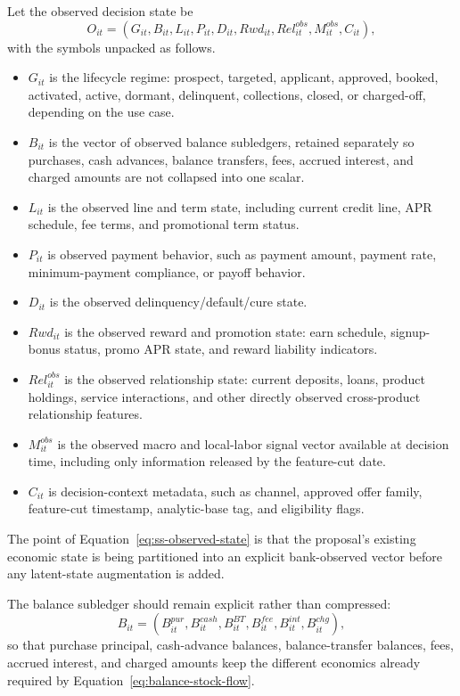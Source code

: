 \documentclass[11pt]{article}
\newcommand{\1}{\mathbf{1}}
\begin{document}
Let the observed decision state be
\begin{equation}
  O_{it}
  =
  (G_{it},B_{it},L_{it},P_{it},D_{it},Rwd_{it},Rel^{obs}_{it},M^{obs}_{it},C_{it}),
  \label{eq:ss-observed-state}
\end{equation}
with the symbols unpacked as follows.
\begin{itemize}[leftmargin=*]
  \item $G_{it}$ is the lifecycle regime: prospect, targeted, applicant,
        approved, booked, activated, active, dormant, delinquent, collections,
        closed, or charged-off, depending on the use case.
  \item $B_{it}$ is the vector of observed balance subledgers, retained
        separately so purchases, cash advances, balance transfers, fees,
        accrued interest, and charged amounts are not collapsed into one scalar.
  \item $L_{it}$ is the observed line and term state, including current credit
        line, APR schedule, fee terms, and promotional term status.
  \item $P_{it}$ is observed payment behavior, such as payment amount,
        payment rate, minimum-payment compliance, or payoff behavior.
  \item $D_{it}$ is the observed delinquency/default/cure state.
  \item $Rwd_{it}$ is the observed reward and promotion state: earn schedule,
        signup-bonus status, promo APR state, and reward liability indicators.
  \item $Rel^{obs}_{it}$ is the observed relationship state: current deposits,
        loans, product holdings, service interactions, and other directly
        observed cross-product relationship features.
  \item $M^{obs}_{it}$ is the observed macro and local-labor signal vector
        available at decision time, including only information released by the
        feature-cut date.
  \item $C_{it}$ is decision-context metadata, such as channel, approved offer
        family, feature-cut timestamp, analytic-base tag, and eligibility flags.
\end{itemize}
The point of Equation~\eqref{eq:ss-observed-state} is that the proposal's
existing economic state is being partitioned into an explicit bank-observed
vector before any latent-state augmentation is added.

The balance subledger should remain explicit rather than compressed:
\begin{equation}
  B_{it}
  =
  (B^{pur}_{it},B^{cash}_{it},B^{BT}_{it},B^{fee}_{it},B^{int}_{it},B^{chg}_{it}),
  \label{eq:ss-balance-subledger}
\end{equation}
so that purchase principal, cash-advance balances, balance-transfer balances,
fees, accrued interest, and charged amounts keep the different economics already
required by Equation~\eqref{eq:balance-stock-flow}.
\end{document}
